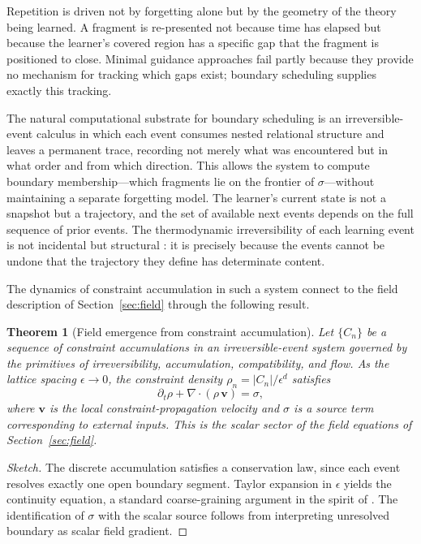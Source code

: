 \documentclass{amsart}
\theoremstyle{plain}
\newtheorem{theorem}{Theorem}[section]
\theoremstyle{definition}
\theoremstyle{remark}
\newcommand{\vfield}{\mathbf{v}}
\begin{document}
Repetition is driven not by forgetting alone but by the geometry of the theory
being learned.  A fragment is re-presented not because time has elapsed but because
the learner's covered region has a specific gap that the fragment is positioned to
close.  Minimal guidance approaches \cite{kirschner2006} fail partly because they
provide no mechanism for tracking which gaps exist; boundary scheduling supplies
exactly this tracking.

The natural computational substrate for boundary scheduling is an irreversible-event
calculus in which each event consumes nested relational structure and leaves a
permanent trace, recording not merely what was encountered but in what order and
from which direction.  This allows the system to compute boundary membership---which
fragments lie on the frontier of $\sigma$---without maintaining a separate
forgetting model.  The learner's current state is not a snapshot but a trajectory,
and the set of available next events depends on the full sequence of prior events.
The thermodynamic irreversibility of each learning event is not incidental but
structural \cite{bennett1982,lloyd2000}: it is precisely because the events cannot
be undone that the trajectory they define has determinate content.

The dynamics of constraint accumulation in such a system connect to the field
description of Section~\ref{sec:field} through the following result.

\begin{theorem}[Field emergence from constraint accumulation]
  \label{thm:emergence}
  Let $\{C_n\}$ be a sequence of constraint accumulations in an irreversible-event
  system governed by the primitives of irreversibility, accumulation,
  compatibility, and flow.  As the lattice spacing $\epsilon \to 0$, the constraint
  density $\rho_n = |C_n|/\epsilon^d$ satisfies
  \[
    \partial_t \rho + \nabla \cdot (\rho\,\vfield) = \sigma,
  \]
  where $\vfield$ is the local constraint-propagation velocity and $\sigma$ is a
  source term corresponding to external inputs.  This is the scalar sector of the
  field equations of Section~\ref{sec:field}.
\end{theorem}

\begin{proof}[Sketch]
  The discrete accumulation satisfies a conservation law, since each event resolves
  exactly one open boundary segment.  Taylor expansion in $\epsilon$ yields the
  continuity equation, a standard coarse-graining argument in the spirit of
  \cite{cross1993,anderson1972}.  The identification of $\sigma$ with the scalar
  source follows from interpreting unresolved boundary as scalar field gradient.
\end{proof}
\end{document}

